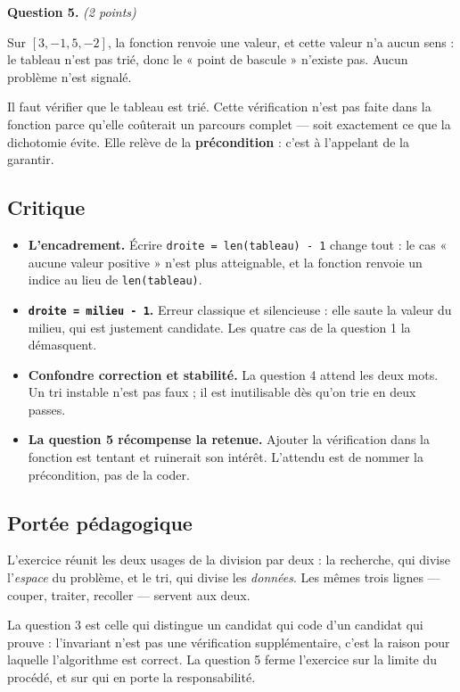 \medskip
\textbf{Question 5.} \emph{(2 points)}

Sur $[3, -1, 5, -2]$, la fonction renvoie une valeur, et cette valeur n'a
aucun sens : le tableau n'est pas trié, donc le « point de bascule » n'existe
pas. Aucun problème n'est signalé.

Il faut vérifier que le tableau est trié. Cette vérification n'est pas faite
dans la fonction parce qu'elle coûterait un parcours complet — soit
exactement ce que la dichotomie évite. Elle relève de la
\textbf{précondition} : c'est à l'appelant de la garantir.

\subsection*{Critique}

\begin{itemize}
  \item \textbf{L'encadrement.} Écrire \lstinline{droite = len(tableau) - 1}
    change tout : le cas « aucune valeur positive » n'est plus atteignable, et
    la fonction renvoie un indice au lieu de \lstinline{len(tableau)}.
  \item \textbf{\lstinline{droite = milieu - 1}.} Erreur classique et
    silencieuse : elle saute la valeur du milieu, qui est justement candidate.
    Les quatre cas de la question 1 la démasquent.
  \item \textbf{Confondre correction et stabilité.} La question 4 attend les
    deux mots. Un tri instable n'est pas faux ; il est inutilisable dès qu'on
    trie en deux passes.
  \item \textbf{La question 5 récompense la retenue.} Ajouter la vérification
    dans la fonction est tentant et ruinerait son intérêt. L'attendu est de
    nommer la précondition, pas de la coder.
\end{itemize}

\subsection*{Portée pédagogique}

L'exercice réunit les deux usages de la division par deux : la recherche, qui
divise l'\emph{espace} du problème, et le tri, qui divise les \emph{données}.
Les mêmes trois lignes — couper, traiter, recoller — servent aux deux.

La question 3 est celle qui distingue un candidat qui code d'un candidat qui
prouve : l'invariant n'est pas une vérification supplémentaire, c'est la raison
pour laquelle l'algorithme est correct. La question 5 ferme l'exercice sur la
limite du procédé, et sur qui en porte la responsabilité.
